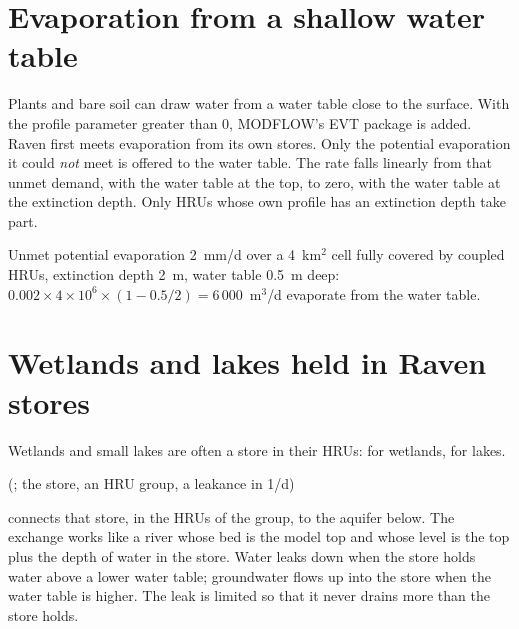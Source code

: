 \section{Evaporation from a shallow water table}\label{sec:uet}
Plants and bare soil can draw water from a water table close to the surface. With the profile parameter
 greater than 0, MODFLOW's EVT package is added. Raven first meets evaporation from its own stores.
Only the potential evaporation it could \emph{not} meet is offered to the water table. The rate falls linearly from that
unmet demand, with the water table at the top, to zero, with the water table at the extinction depth. Only HRUs whose own
profile has an extinction depth take part.
\begin{example}
Unmet potential evaporation 2~mm/d over a 4~km$^2$ cell fully covered by coupled HRUs, extinction depth 2~m, water table
0.5~m deep: $0.002\times4\times10^6\times(1-0.5/2)=6\,000$~m$^3$/d evaporate from the water table.
\end{example}

\section{Wetlands and lakes held in Raven stores}\label{sec:ustores}
Wetlands and small lakes are often a store in their HRUs:  for wetlands,  for lakes.
\begin{whattowrite}
\quad (; the store, an HRU group, a leakance in 1/d)
\end{whattowrite}
connects that store, in the HRUs of the group, to the aquifer below. The exchange works like a river whose bed is the model
top and whose level is the top plus the depth of water in the store. Water leaks down when the store holds water above
a lower water table; groundwater flows up into the store when the water table is higher. The leak is limited so that it
never drains more than the store holds.

